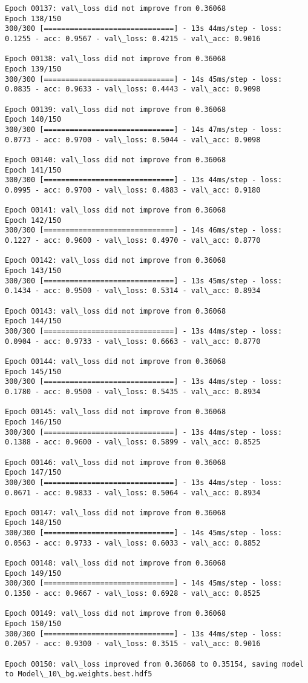 \documentclass[11pt]{article}
\begin{document}
\begin{Verbatim}[commandchars=\\\{\}]
Epoch 00137: val\_loss did not improve from 0.36068
Epoch 138/150
300/300 [==============================] - 13s 44ms/step - loss: 0.1255 - acc: 0.9567 - val\_loss: 0.4215 - val\_acc: 0.9016

Epoch 00138: val\_loss did not improve from 0.36068
Epoch 139/150
300/300 [==============================] - 14s 45ms/step - loss: 0.0835 - acc: 0.9633 - val\_loss: 0.4443 - val\_acc: 0.9098

Epoch 00139: val\_loss did not improve from 0.36068
Epoch 140/150
300/300 [==============================] - 14s 47ms/step - loss: 0.0773 - acc: 0.9700 - val\_loss: 0.5044 - val\_acc: 0.9098

Epoch 00140: val\_loss did not improve from 0.36068
Epoch 141/150
300/300 [==============================] - 13s 44ms/step - loss: 0.0995 - acc: 0.9700 - val\_loss: 0.4883 - val\_acc: 0.9180

Epoch 00141: val\_loss did not improve from 0.36068
Epoch 142/150
300/300 [==============================] - 14s 46ms/step - loss: 0.1227 - acc: 0.9600 - val\_loss: 0.4970 - val\_acc: 0.8770

Epoch 00142: val\_loss did not improve from 0.36068
Epoch 143/150
300/300 [==============================] - 13s 45ms/step - loss: 0.1434 - acc: 0.9500 - val\_loss: 0.5314 - val\_acc: 0.8934

Epoch 00143: val\_loss did not improve from 0.36068
Epoch 144/150
300/300 [==============================] - 13s 44ms/step - loss: 0.0904 - acc: 0.9733 - val\_loss: 0.6663 - val\_acc: 0.8770

Epoch 00144: val\_loss did not improve from 0.36068
Epoch 145/150
300/300 [==============================] - 13s 44ms/step - loss: 0.1780 - acc: 0.9500 - val\_loss: 0.5435 - val\_acc: 0.8934

Epoch 00145: val\_loss did not improve from 0.36068
Epoch 146/150
300/300 [==============================] - 13s 44ms/step - loss: 0.1388 - acc: 0.9600 - val\_loss: 0.5899 - val\_acc: 0.8525

Epoch 00146: val\_loss did not improve from 0.36068
Epoch 147/150
300/300 [==============================] - 13s 44ms/step - loss: 0.0671 - acc: 0.9833 - val\_loss: 0.5064 - val\_acc: 0.8934

Epoch 00147: val\_loss did not improve from 0.36068
Epoch 148/150
300/300 [==============================] - 14s 45ms/step - loss: 0.0563 - acc: 0.9733 - val\_loss: 0.6033 - val\_acc: 0.8852

Epoch 00148: val\_loss did not improve from 0.36068
Epoch 149/150
300/300 [==============================] - 14s 45ms/step - loss: 0.1350 - acc: 0.9667 - val\_loss: 0.6928 - val\_acc: 0.8525

Epoch 00149: val\_loss did not improve from 0.36068
Epoch 150/150
300/300 [==============================] - 13s 44ms/step - loss: 0.2057 - acc: 0.9300 - val\_loss: 0.3515 - val\_acc: 0.9016

Epoch 00150: val\_loss improved from 0.36068 to 0.35154, saving model to Model\_10\_bg.weights.best.hdf5

    \end{Verbatim}
\end{document}
